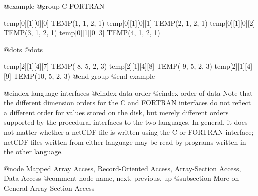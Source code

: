@example
@group
              C                  FORTRAN

     temp[0][1][0][0]      TEMP(1, 1, 2, 1)
     temp[0][1][0][1]      TEMP(2, 1, 2, 1)
     temp[0][1][0][2]      TEMP(3, 1, 2, 1)
     temp[0][1][0][3]      TEMP(4, 1, 2, 1)

           @dots{}                 @dots{}

     temp[2][1][4][7]      TEMP( 8, 5, 2, 3)
     temp[2][1][4][8]      TEMP( 9, 5, 2, 3)
     temp[2][1][4][9]      TEMP(10, 5, 2, 3)
@end group
@end example

@cindex language interfaces
@cindex data order
@cindex order of data
Note that the different dimension orders for the C and FORTRAN
interfaces do not reflect a different order for values stored on the
disk, but merely different orders supported by the procedural interfaces
to the two languages.  In general, it does not matter whether a netCDF
file is written using the C or FORTRAN interface; netCDF files written
from either language may be read by programs written in the other
language.

@node Mapped Array Access, Record-Oriented Access, Array-Section Access, Data Access
@comment  node-name,  next,  previous,  up
@subsection More on General Array Section Access

